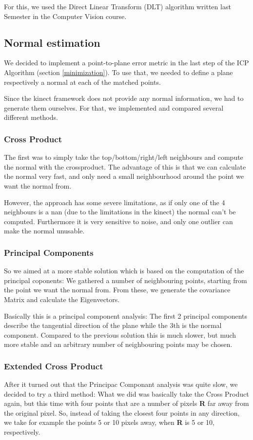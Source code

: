 \documentclass[10pt,twocolumn,letterpaper]{article}
\begin{document}
For this, we used the Direct Linear Transform (DLT) algorithm written last Semester in the Computer Vision course.

\subsection{Normal estimation}
We decided to implement a point-to-plane error metric in the last step of the ICP Algorithm (section \ref{minimization}).
To use that, we needed to define a plane respectively a normal at each of the matched points.

Since the kinect framework does not provide any normal information, we had to generate them ourselves.
For that, we implemented and compared several different methods.

\subsubsection{Cross Product}
The first was to simply take the top/bottom/right/left neighbours and compute the normal with the crossproduct.
The advantage of this is that we can calculate the normal very fast, and only need a small neighbourhood around the point
we want the normal from.

However, the approach has some severe limitations, as if only one of the 4 neighbours is a nan
(due to the limitations in the kinect) the normal can't be computed.
Furthermore it is very sensitive to noise, and only one outlier can make the normal unusable.

\subsubsection{Principal Components}
So we aimed at a more stable solution which is based on the computation of the principal coponents: We gathered a number of neighbouring
points, starting from the point we want the normal from. From these, we generate the covariance Matrix and calculate the Eigenvectors.

Basically this is a principal component analysis: The first 2 principal components describe the tangential direction of
the plane while the 3th is the normal component.
Compared to the previous solution this is much slower, but much more stable and an arbitrary number of neighbouring points may be chosen.

\subsubsection{Extended Cross Product}
After it turned out that the Principac Componant analysis was quite slow, we decided to try a third method: What we did was basically take the Cross
Product again, but this time with four points that are a number of pixels \textbf{R} far away from the original pixel. So, instead of taking the closest
four points in any direction, we take for example the points 5 or 10 pixels away, when \textbf{R} is 5 or 10, respectively.
\end{document}
